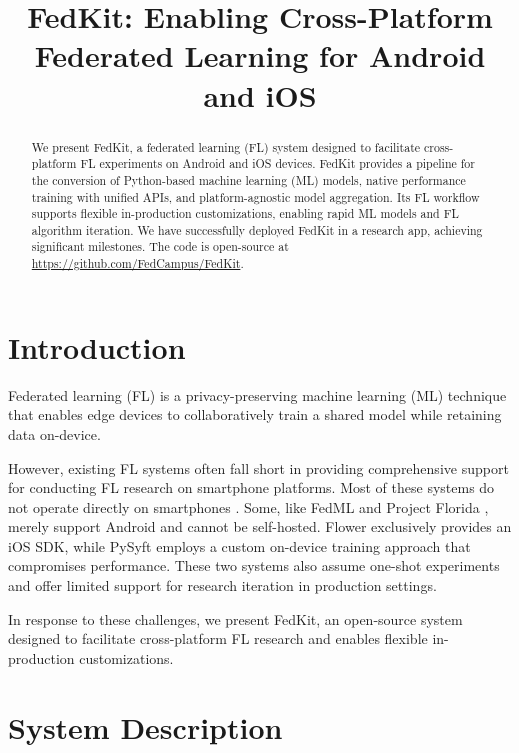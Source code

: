 \documentclass[letterpaper]{article} %
\title{FedKit: Enabling Cross-Platform Federated Learning for Android and iOS}
\author{}
\begin{document}
\maketitle

\begin{abstract}
    We present FedKit, a federated learning (FL) system designed to
    facilitate cross-platform FL experiments on Android and iOS devices.
    FedKit provides a pipeline for the conversion of
    Python-based machine learning (ML) models,
    native performance training with unified APIs,
    and platform-agnostic model aggregation.
    Its FL workflow supports flexible in-production customizations,
    enabling rapid ML models and FL algorithm iteration.
    We have successfully deployed FedKit in a research app,
    achieving significant milestones.
    The code is open-source at \url{https://github.com/FedCampus/FedKit}.
\end{abstract}

\section{Introduction}

Federated learning (FL) \cite{mcmahan2017communication}
is a privacy-preserving machine learning (ML) technique
that enables edge devices to collaboratively train a shared model while
retaining data on-device.

However, existing FL systems often fall short in
providing comprehensive support for conducting FL research on
smartphone platforms.
Most of these systems do not operate directly on smartphones
\cite[e.g.,][]{bonawitz2019towards,liu2021fate,ma2019paddlepaddle,openfl_citation}.
Some, like FedML \cite{he2020fedml} and
Project Florida \cite{madrigal2023project},
merely support Android and cannot be self-hosted.
Flower \cite{beutel2020flower,mathur2021ondevice} exclusively provides
an iOS SDK,
while PySyft \cite{ryffel2018generic,Ziller2021,hall2021syft} employs
a custom on-device training approach that compromises performance.
These two systems also assume one-shot experiments and
offer limited support for research iteration in production settings.

In response to these challenges, we present FedKit,
an open-source system designed to facilitate cross-platform FL research and
enables flexible in-production customizations.

\section{System Description}
\end{document}
